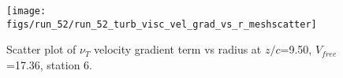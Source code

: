 \begin{figure}[H]
\centering
\texttt{[image: figs/run\_52/run\_52\_turb\_visc\_vel\_grad\_vs\_r\_meshscatter]}
\caption{Scatter plot of $\nu_T$ velocity gradient term vs radius at $z/c$=9.50, $V_{free}$=17.36, station 6.}
\label{fig:run_52_turb_visc_vel_grad_vs_r_meshscatter}
\end{figure}


